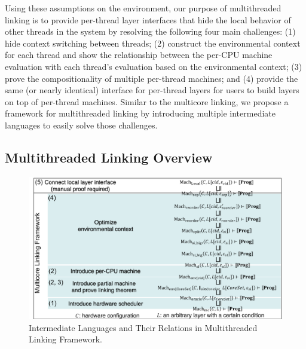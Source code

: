 Using these assumptions on the environment, our purpose of multithreaded linking is to provide per-thread layer interfaces that hide the local behavior of other threads in the system by resolving the following four main challenges: 
(1) hide context switching between threads; 
(2) construct the environmental context for each thread and show the relationship between the per-CPU machine evaluation with each thread’s evaluation based on the environmental context; 
(3) prove the compositionality of multiple per-thread machines; and 
(4) provide the same (or nearly identical) interface for per-thread layers for users to build layers on top of per-thread machines. 
Similar to the multicore linking, we propose a framework for multithreaded linking by introducing multiple intermediate languages to easily solve those challenges.




\subsection{Multithreaded Linking Overview}
\label{chapter:linking:subsec:multithreaded-linking-overview}



\begin{figure}
\begin{center}
\includegraphics[width=\textwidth, page=2]{figs/conlink/concurrent_linking}
\caption{Intermediate Languages and Their Relations  in Multithreaded Linking Framework.}
\label{fig:chapter:linking:multithreaded-linking-structure}
\end{center}
\end{figure}

